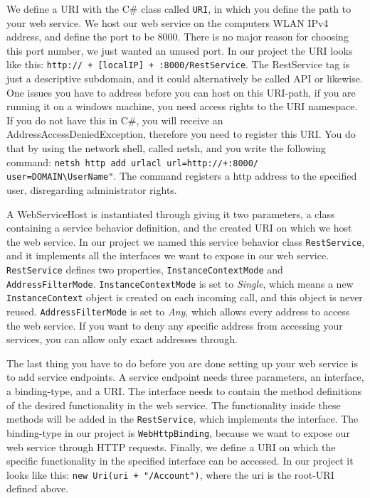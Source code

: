 We define a URI with the C\# class called \texttt{URI}, in which you define the path to your web service. We host our web service on the computers WLAN IPv4 address, and define the port to be 8000. There is no major reason for choosing this port number, we just wanted an unused port. In our project the URI looks like this: \texttt{http:// + [localIP] + :8000/RestService}. The RestService tag is just a descriptive subdomain, and it could alternatively be called API or likewise. One issues you have to address before you can host on this URI-path, if you are running it on a windows machine, you need access rights to the URI namespace. If you do not have this in C\#, you will receive an AddressAccessDeniedException, therefore you need to register this URI. You do that by using the network shell, called netsh, and you write the following command: \texttt{netsh http add urlacl url=http://+:8000/ user=DOMAIN\textbackslash UserName"}. The command registers a http address to the specified user, disregarding administrator rights\cite{netshuri}.

A WebServiceHost is instantiated through giving it two parameters, a class containing a service behavior definition, and the created URI on which we host the web service. In our project we named this service behavior class \texttt{RestService}, and it implements all the interfaces we want to expose in our web service. \texttt{RestService} defines two properties, \texttt{InstanceContextMode} and \texttt{AddressFilterMode}. \texttt{InstanceContextMode} is set to \textit{Single}, which means a new \texttt{InstanceContext} object is created on each incoming call, and this object is never reused. \texttt{AddressFilterMode} is set to \textit{Any}, which allows every address to access the web service. If you want to deny any specific address from accessing your services, you can allow only exact addresses through. 

The last thing you have to do before you are done setting up your web service is to add service endpoints. A service endpoint needs three parameters, an interface, a binding-type, and a URI. The interface needs to contain the method definitions of the desired functionality in the web service. The functionality inside these methods will be added in the \texttt{RestService}, which implements the interface. The binding-type in our project is \texttt{WebHttpBinding}, because we want to expose our web service through HTTP requests. Finally, we define a URI on which the specific functionality in the specified interface can be accessed. In our project it looks like this: \texttt{new Uri(uri + "/Account")}, where the uri is the root-URI defined above.


